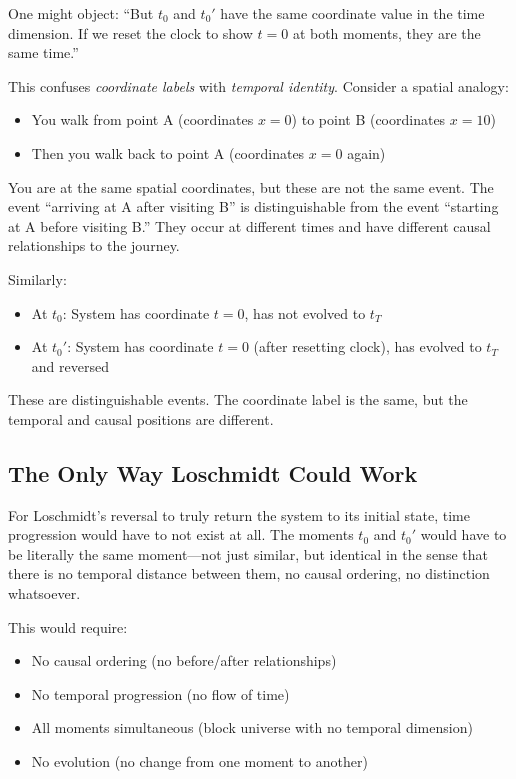 \documentclass[twocolumn,10pt]{article}
\theoremstyle{definition}
\theoremstyle{remark}
\begin{document}
\vspace{0.2cm}
\noindent One might object: ``But $t_0$ and $t_0'$ have the same coordinate value in the time dimension. If we reset the clock to show $t=0$ at both moments, they are the same time.''

\vspace{0.2cm}
\noindent This confuses \textit{coordinate labels} with \textit{temporal identity}. Consider a spatial analogy:

\begin{itemize}
\item You walk from point A (coordinates $x=0$) to point B (coordinates $x=10$)
\item Then you walk back to point A (coordinates $x=0$ again)
\end{itemize}

\noindent You are at the same spatial coordinates, but these are not the same event. The event ``arriving at A after visiting B'' is distinguishable from the event ``starting at A before visiting B.'' They occur at different times and have different causal relationships to the journey.

\vspace{0.2cm}
\noindent Similarly:
\begin{itemize}
\item At $t_0$: System has coordinate $t=0$, has not evolved to $t_T$
\item At $t_0'$: System has coordinate $t=0$ (after resetting clock), has evolved to $t_T$ and reversed
\end{itemize}

\noindent These are distinguishable events. The coordinate label is the same, but the temporal and causal positions are different.

\subsection{The Only Way Loschmidt Could Work}

For Loschmidt's reversal to truly return the system to its initial state, time progression would have to not exist at all. The moments $t_0$ and $t_0'$ would have to be literally the same moment—not just similar, but identical in the sense that there is no temporal distance between them, no causal ordering, no distinction whatsoever.

\vspace{0.2cm}
\noindent This would require:
\begin{itemize}
\item No causal ordering (no before/after relationships)
\item No temporal progression (no flow of time)
\item All moments simultaneous (block universe with no temporal dimension)
\item No evolution (no change from one moment to another)
\end{itemize}
\end{document}
